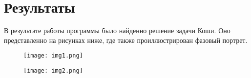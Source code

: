 \documentclass{report}
\begin{document}
\section*{Результаты}
В результате работы программы было найденно решение задачи Коши. Оно представленно на рисунках ниже, где также проиллюстрирован фазовый портрет.

\begin{figure}[h]
    \centering
    \texttt{[image: img1.png]}
\end{figure}

\begin{figure}[h]
    \centering
    \texttt{[image: img2.png]}
\end{figure}
\end{document}
